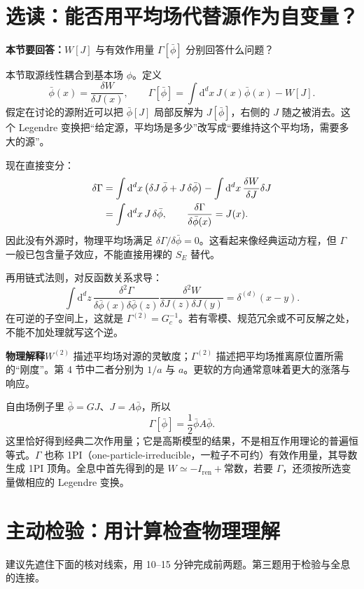 \documentclass[11pt,a4paper]{article}
\newcommand{\dd}{\mathrm d}
\newcommand{\intx}{\int\dd^d x\,}
\newcommand{\physicsnote}[1]{\par\smallskip\noindent\colorbox{pale}{\parbox{\dimexpr\linewidth-2\fboxsep\relax}{\textbf{物理解释}\quad #1}}\par\smallskip}
\newcommand{\question}[1]{\textbf{本节要回答：}#1\par}
\begin{document}
\newpage
\section{选读：能否用平均场代替源作为自变量？}
\question{\(W[J]\) 与有效作用量 \(\Gamma[\bar\phi]\) 分别回答什么问题？}
本节取源线性耦合到基本场 \(\phi\)。定义
\begin{equation}
 \bar\phi(x)=\frac{\delta W}{\delta J(x)},\qquad
 \Gamma[\bar\phi]=\intx J(x)\bar\phi(x)-W[J].
\end{equation}
假定在讨论的源附近可以把 \(\bar\phi[J]\) 局部反解为 \(J[\bar\phi]\)，右侧的 \(J\) 随之被消去。这个 Legendre 变换把“给定源，平均场是多少”改写成“要维持这个平均场，需要多大的源”。

现在直接变分：
\begin{align}
 \delta\Gamma
 &=\intx\bigl(\delta J\,\bar\phi+J\,\delta\bar\phi\bigr)
   -\intx\frac{\delta W}{\delta J}\delta J\notag\\
 &=\intx J\,\delta\bar\phi,
 \qquad \frac{\delta\Gamma}{\delta\bar\phi(x)}=J(x).
\end{align}
因此没有外源时，物理平均场满足 \(\delta\Gamma/\delta\bar\phi=0\)。这看起来像经典运动方程，但 \(\Gamma\) 一般已包含量子效应，不能直接用裸的 \(S_E\) 替代。

再用链式法则，对反函数关系求导：
\begin{equation}
 \int\dd^d z\,
 \frac{\delta^2\Gamma}{\delta\bar\phi(x)\delta\bar\phi(z)}
 \frac{\delta^2W}{\delta J(z)\delta J(y)}
 =\delta^{(d)}(x-y).
\end{equation}
在可逆的子空间上，这就是 \(\Gamma^{(2)}=G_c^{-1}\)。若有零模、规范冗余或不可反解之处，不能不加处理就写这个逆。

\physicsnote{\(W^{(2)}\) 描述平均场对源的灵敏度；\(\Gamma^{(2)}\) 描述把平均场推离原位置所需的“刚度”。第 4 节中二者分别为 \(1/a\) 与 \(a\)。更软的方向通常意味着更大的涨落与响应。}
自由场例子里 \(\bar\phi=GJ\)、\(J=A\bar\phi\)，所以
\begin{equation}
 \Gamma[\bar\phi]=\frac12\bar\phi A\bar\phi.
\end{equation}
这里恰好得到经典二次作用量；它是高斯模型的结果，不是相互作用理论的普遍恒等式。\(\Gamma\) 也称 1PI（one-particle-irreducible，一粒子不可约）有效作用量，其导数生成 1PI 顶角。全息中首先得到的是 \(W\simeq-I_{\mathrm{ren}}+\text{常数}\)，若要 \(\Gamma\)，还须按所选变量做相应的 Legendre 变换。

\newpage
\section{主动检验：用计算检查物理理解}
建议先遮住下面的核对线索，用 10--15 分钟完成前两题。第三题用于检验与全息的连接。
\end{document}
